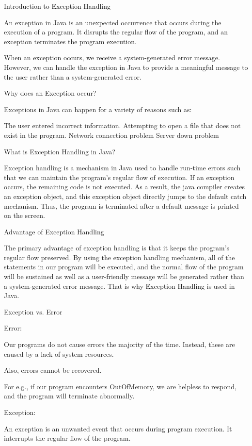 Introduction to Exception Handling
 

An exception in Java is an unexpected occurrence that occurs during the execution of a program. It disrupts the regular flow of the program, and an exception terminates the program execution.

When an exception occurs, we receive a system-generated error message. However, we can handle the exception in Java to provide a meaningful message to the user rather than a system-generated error.


Why does an Exception occur?
 

Exceptions in Java can happen for a variety of reasons such as:

The user entered incorrect information.
Attempting to open a file that does not exist in the program.
Network connection problem
Server down problem
 

What is Exception Handling in Java?
 

Exception handling is a mechanism in Java used to handle run-time errors such that we can maintain the program's regular flow of execution. If an exception occurs, the remaining code is not executed. As a result, the java compiler creates an exception object, and this exception object directly jumps to the default catch mechanism. Thus, the program is terminated after a default message is printed on the screen.

 
Advantage of Exception Handling
 

The primary advantage of exception handling is that it keeps the program's regular flow preserved. By using the exception handling mechanism, all of the statements in our program will be executed, and the normal flow of the program will be sustained as well as a user-friendly message will be generated rather than a system-generated error message. That is why Exception Handling is used in Java.

 
Exception vs. Error
 

Error:
 

Our programs do not cause errors the majority of the time. Instead, these are caused by a lack of system resources.

Also, errors cannot be recovered.

For e.g., if our program encounters OutOfMemory, we are helpless to respond, and the program will terminate abnormally.

 

Exception:
 

An exception is an unwanted event that occurs during program execution. It interrupts the regular flow of the program.

